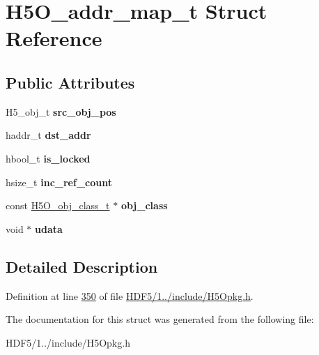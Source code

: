 \hypertarget{struct_h5_o__addr__map__t}{}\section{H5\+O\+\_\+addr\+\_\+map\+\_\+t Struct Reference}
\label{struct_h5_o__addr__map__t}
\subsection*{Public Attributes}
\begin{DoxyCompactItemize}
\item 
\mbox{\label{struct_h5_o__addr__map__t_a6ff9e748531ef681e9de788caaac3b71}} 
H5\+\_\+obj\+\_\+t {\bfseries src\+\_\+obj\+\_\+pos}
\item 
\mbox{\label{struct_h5_o__addr__map__t_aa5bc3d0442c1b48cac2f1cbe79f4015d}} 
haddr\+\_\+t {\bfseries dst\+\_\+addr}
\item 
\mbox{\label{struct_h5_o__addr__map__t_a9dcd3f118a003fde7d89b135e3d91b86}} 
hbool\+\_\+t {\bfseries is\+\_\+locked}
\item 
\mbox{\label{struct_h5_o__addr__map__t_a361c5121ed6fdac24720d383479e356f}} 
hsize\+\_\+t {\bfseries inc\+\_\+ref\+\_\+count}
\item 
\mbox{\label{struct_h5_o__addr__map__t_a2475d1fc555b3f61093b44fa530ccef5}} 
const \hyperlink{struct_h5_o__obj__class__t}{H5\+O\+\_\+obj\+\_\+class\+\_\+t} $\ast$ {\bfseries obj\+\_\+class}
\item 
\mbox{\label{struct_h5_o__addr__map__t_a01bfe97d405881b5734dba049757df7a}} 
void $\ast$ {\bfseries udata}
\end{DoxyCompactItemize}


\subsection{Detailed Description}


Definition at line \hyperlink{_h_d_f5_21_810_81_2include_2_h5_opkg_8h_source_l00350}{350} of file \hyperlink{_h_d_f5_21_810_81_2include_2_h5_opkg_8h_source}{H\+D\+F5/1../include/\+H5\+Opkg.\+h}.



The documentation for this struct was generated from the following file\+:\begin{DoxyCompactItemize}
\item 
H\+D\+F5/1../include/\+H5\+Opkg.\+h\end{DoxyCompactItemize}
